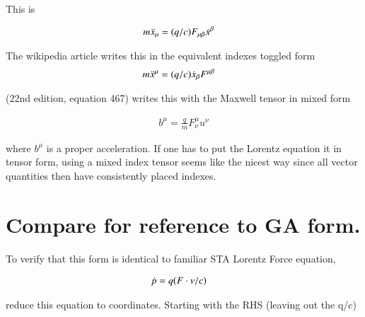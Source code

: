\documentclass{article}
\begin{document}
This is

\begin{align}\label{eqn:fromLagrangian}
m \ddot{x}_\mu &= (q/c) F_{\mu\beta} \dot{x}^\beta 
\end{align}

The wikipedia article \cite{wikiLorentzForce} writes this in the equivalent indexes toggled form
\begin{align*}
m \ddot{x}^\mu &= (q/c) \dot{x}_\beta F^{\mu\beta}
\end{align*}

\cite{schiller:mm} (22nd edition, equation 467) writes this with the
Maxwell tensor in mixed form

\begin{align*}
b^\mu = \frac{q}{m} F_\nu^\mu u^\nu
\end{align*}

where $b^\mu$ is a proper acceleration.  If one has to put the Lorentz 
equation it in tensor
form, using a mixed index tensor seems like the nicest way since all
vector quantities then have consistently placed indexes.

%

\section{ Compare for reference to GA form. }

To verify that this form is identical to familiar STA Lorentz Force equation,

\begin{align}
\dot{p} &= q (F \cdot v/c) 
\end{align}

reduce this equation to coordinates.  Starting with the RHS (leaving out the q/c)
\end{document}
